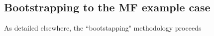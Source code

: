 \subsection{Bootstrapping to the MF example case}

As detailed elsewhere, the ``bootstapping" methodology proceeds 